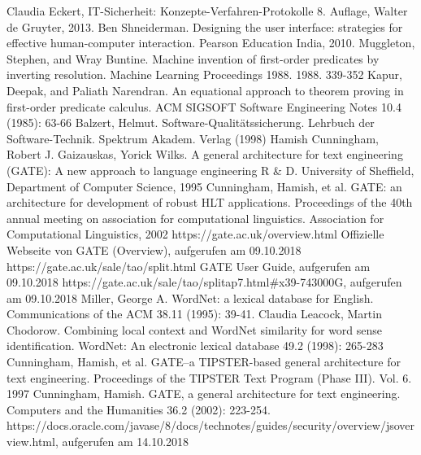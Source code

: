 \documentclass[12pt]{report}
\begin{document}
\begin{thebibliography}{20}
Claudia Eckert, \glqq  IT-Sicherheit: Konzepte-Verfahren-Protokolle\grqq{}  8. Auflage, Walter de Gruyter, 2013.
Ben Shneiderman. Designing the user interface: strategies for effective human-computer interaction. Pearson Education India, 2010.
Muggleton, Stephen, and Wray Buntine. \glqq  Machine invention of first-order predicates by inverting resolution.\grqq{}  Machine Learning Proceedings 1988. 1988. 339-352
Kapur, Deepak, and Paliath Narendran. \glqq  An equational approach to theorem proving in first-order predicate calculus.\grqq{}  ACM SIGSOFT Software Engineering Notes 10.4 (1985): 63-66
Balzert, Helmut. \glqq  Software-Qualitätssicherung.\grqq{}  Lehrbuch der Software-Technik. Spektrum Akadem. Verlag (1998)
 Hamish Cunningham, Robert J. Gaizauskas, Yorick Wilks. A general architecture for text engineering (GATE): A new approach to language engineering R \& D. University of Sheffield, Department of Computer Science, 1995
 Cunningham, Hamish, et al. \glqq  GATE: an architecture for development of robust HLT applications.\grqq{}  Proceedings of the 40th annual meeting on association for computational linguistics. Association for Computational Linguistics, 2002
 https://gate.ac.uk/overview.html Offizielle Webseite von GATE (Overview), aufgerufen am 09.10.2018
 https://gate.ac.uk/sale/tao/split.html GATE User Guide, aufgerufen am 09.10.2018
 https://gate.ac.uk/sale/tao/splitap7.html\#x39-743000G, aufgerufen am 09.10.2018
Miller, George A. \glqq   WordNet: a lexical database for English.\grqq{}  Communications of the ACM 38.11 (1995): 39-41.
Claudia Leacock, Martin Chodorow. \glqq   Combining local context and WordNet similarity for word sense identification.\grqq{}  WordNet: An electronic lexical database 49.2 (1998): 265-283
Cunningham, Hamish, et al. \glqq   GATE–a TIPSTER-based general architecture for text engineering.\grqq{}  Proceedings of the TIPSTER Text Program (Phase III). Vol. 6. 1997
Cunningham, Hamish. \glqq   GATE, a general architecture for text engineering.\grqq{}  Computers and the Humanities 36.2 (2002): 223-254.
 https://docs.oracle.com/javase/8/docs/technotes/guides/security/overview/jsoverview.html, aufgerufen am 14.10.2018
\end{thebibliography}
\end{document}
